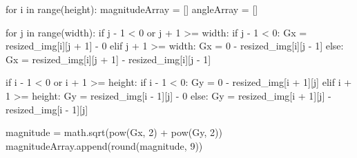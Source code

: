 \documentclass[
  letterpaper,
  DIV=11,
  numbers=noendperiod]{scrreprt}
\newenvironment{Shaded}{\begin{snugshade}}{\end{snugshade}}
\newcommand{\BuiltInTok}[1]{\textcolor[rgb]{0.00,0.23,0.31}{#1}}
\newcommand{\ControlFlowTok}[1]{\textcolor[rgb]{0.00,0.23,0.31}{#1}}
\newcommand{\DecValTok}[1]{\textcolor[rgb]{0.68,0.00,0.00}{#1}}
\newcommand{\KeywordTok}[1]{\textcolor[rgb]{0.00,0.23,0.31}{#1}}
\newcommand{\NormalTok}[1]{\textcolor[rgb]{0.00,0.23,0.31}{#1}}
\newcommand{\OperatorTok}[1]{\textcolor[rgb]{0.37,0.37,0.37}{#1}}
\begin{document}
\begin{Shaded}
\begin{Highlighting}[]
    \ControlFlowTok{for}\NormalTok{ i }\KeywordTok{in} \BuiltInTok{range}\NormalTok{(height):}
\NormalTok{        magnitudeArray }\OperatorTok{=}\NormalTok{ []}
\NormalTok{        angleArray }\OperatorTok{=}\NormalTok{ []}

        \ControlFlowTok{for}\NormalTok{ j }\KeywordTok{in} \BuiltInTok{range}\NormalTok{(width):}
            \ControlFlowTok{if}\NormalTok{ j }\OperatorTok{{-}} \DecValTok{1} \OperatorTok{\textless{}} \DecValTok{0} \KeywordTok{or}\NormalTok{ j }\OperatorTok{+} \DecValTok{1} \OperatorTok{\textgreater{}=}\NormalTok{ width:}
                \ControlFlowTok{if}\NormalTok{ j }\OperatorTok{{-}} \DecValTok{1} \OperatorTok{\textless{}} \DecValTok{0}\NormalTok{:}
\NormalTok{                    Gx }\OperatorTok{=}\NormalTok{ resized\_img[i][j }\OperatorTok{+} \DecValTok{1}\NormalTok{] }\OperatorTok{{-}} \DecValTok{0}
                \ControlFlowTok{elif}\NormalTok{ j }\OperatorTok{+} \DecValTok{1} \OperatorTok{\textgreater{}=}\NormalTok{ width:}
\NormalTok{                    Gx }\OperatorTok{=} \DecValTok{0} \OperatorTok{{-}}\NormalTok{ resized\_img[i][j }\OperatorTok{{-}} \DecValTok{1}\NormalTok{]}
            \ControlFlowTok{else}\NormalTok{:}
\NormalTok{                Gx }\OperatorTok{=}\NormalTok{ resized\_img[i][j }\OperatorTok{+} \DecValTok{1}\NormalTok{] }\OperatorTok{{-}}\NormalTok{ resized\_img[i][j }\OperatorTok{{-}} \DecValTok{1}\NormalTok{]}

            \ControlFlowTok{if}\NormalTok{ i }\OperatorTok{{-}} \DecValTok{1} \OperatorTok{\textless{}} \DecValTok{0} \KeywordTok{or}\NormalTok{ i }\OperatorTok{+} \DecValTok{1} \OperatorTok{\textgreater{}=}\NormalTok{ height:}
                \ControlFlowTok{if}\NormalTok{ i }\OperatorTok{{-}} \DecValTok{1} \OperatorTok{\textless{}} \DecValTok{0}\NormalTok{:}
\NormalTok{                    Gy }\OperatorTok{=} \DecValTok{0} \OperatorTok{{-}}\NormalTok{ resized\_img[i }\OperatorTok{+} \DecValTok{1}\NormalTok{][j]}
                \ControlFlowTok{elif}\NormalTok{ i }\OperatorTok{+} \DecValTok{1} \OperatorTok{\textgreater{}=}\NormalTok{ height:}
\NormalTok{                    Gy }\OperatorTok{=}\NormalTok{ resized\_img[i }\OperatorTok{{-}} \DecValTok{1}\NormalTok{][j] }\OperatorTok{{-}} \DecValTok{0}
            \ControlFlowTok{else}\NormalTok{:}
\NormalTok{                Gy }\OperatorTok{=}\NormalTok{ resized\_img[i }\OperatorTok{+} \DecValTok{1}\NormalTok{][j] }\OperatorTok{{-}}\NormalTok{ resized\_img[i }\OperatorTok{{-}} \DecValTok{1}\NormalTok{][j]}

\NormalTok{            magnitude }\OperatorTok{=}\NormalTok{ math.sqrt(}\BuiltInTok{pow}\NormalTok{(Gx, }\DecValTok{2}\NormalTok{) }\OperatorTok{+} \BuiltInTok{pow}\NormalTok{(Gy, }\DecValTok{2}\NormalTok{))}
\NormalTok{            magnitudeArray.append(}\BuiltInTok{round}\NormalTok{(magnitude, }\DecValTok{9}\NormalTok{))}


\end{Highlighting}
\end{Shaded}
\end{document}
